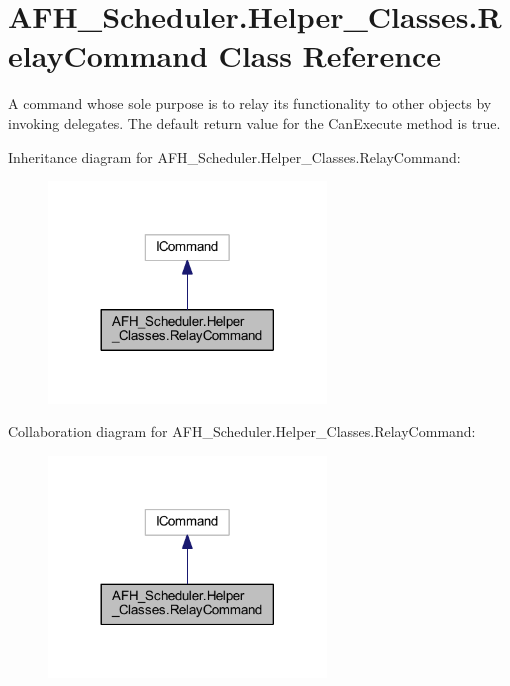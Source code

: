 \section{A\+F\+H\+\_\+\+Scheduler.\+Helper\+\_\+\+Classes.\+Relay\+Command Class Reference}
\label{class_a_f_h___scheduler_1_1_helper___classes_1_1_relay_command}


A command whose sole purpose is to relay its functionality to other objects by invoking delegates. The default return value for the Can\+Execute method is \textquotesingle{}true\textquotesingle{}.  




Inheritance diagram for A\+F\+H\+\_\+\+Scheduler.\+Helper\+\_\+\+Classes.\+Relay\+Command\+:
\nopagebreak
\begin{figure}[H]
\begin{center}
\leavevmode
\includegraphics[width=209pt]{class_a_f_h___scheduler_1_1_helper___classes_1_1_relay_command__inherit__graph}
\end{center}
\end{figure}


Collaboration diagram for A\+F\+H\+\_\+\+Scheduler.\+Helper\+\_\+\+Classes.\+Relay\+Command\+:
\nopagebreak
\begin{figure}[H]
\begin{center}
\leavevmode
\includegraphics[width=209pt]{class_a_f_h___scheduler_1_1_helper___classes_1_1_relay_command__coll__graph}
\end{center}
\end{figure}
